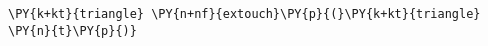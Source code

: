 \begin{Verbatim}[commandchars=\\\{\}]
    \PY{k+kt}{triangle} \PY{n+nf}{extouch}\PY{p}{(}\PY{k+kt}{triangle} \PY{n}{t}\PY{p}{)}
\end{Verbatim}
